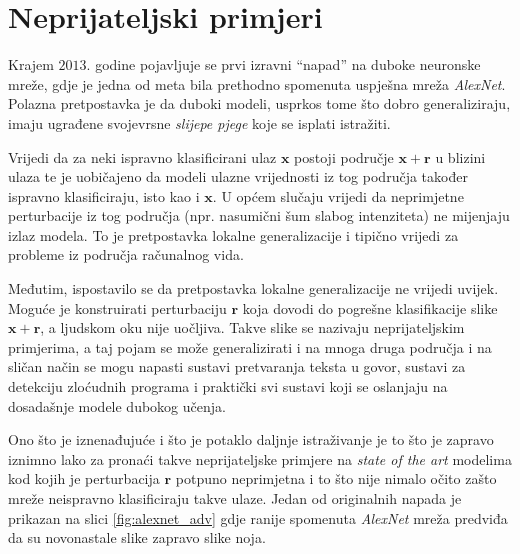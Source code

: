 \documentclass[utf8, diplomski]{fer}
\begin{document}
\section{Neprijateljski primjeri}
Krajem $2013.$ godine pojavljuje se prvi izravni ``napad'' na duboke neuronske mreže\citep{Szegedy2014IntriguingPO}, gdje je jedna od meta bila prethodno spomenuta uspješna mreža \textit{AlexNet}. Polazna pretpostavka je da duboki modeli, usprkos tome što dobro generaliziraju, imaju ugrađene svojevrsne \textit{slijepe pjege} koje se isplati istražiti.
\par
Vrijedi da za neki ispravno klasificirani ulaz $\boldsymbol{x}$ postoji područje $\boldsymbol{x} + \boldsymbol{r}$ u blizini ulaza te je uobičajeno da modeli ulazne vrijednosti iz tog područja također ispravno klasificiraju, isto kao i $\boldsymbol{x}$. U općem slučaju vrijedi da neprimjetne perturbacije iz tog područja (npr. nasumični šum slabog intenziteta) ne mijenjaju izlaz modela. To je pretpostavka lokalne generalizacije i tipično vrijedi za probleme iz područja računalnog vida.
\par
Međutim, ispostavilo se da pretpostavka lokalne generalizacije ne vrijedi uvijek. Moguće je konstruirati perturbaciju $\boldsymbol{r}$ koja dovodi do pogrešne klasifikacije slike $\boldsymbol{x} + \boldsymbol{r}$, a ljudskom oku nije uočljiva. Takve slike se nazivaju neprijateljskim primjerima, a taj pojam se može generalizirati i na mnoga druga područja i na sličan način se mogu napasti sustavi pretvaranja teksta u govor, sustavi za detekciju zloćudnih programa i praktički svi sustavi koji se oslanjaju na dosadašnje modele dubokog učenja. 
\par
Ono što je iznenađujuće i što je potaklo daljnje istraživanje je to što je zapravo iznimno lako za pronaći takve neprijateljske primjere na \textit{state of the art} modelima kod kojih je perturbacija $\boldsymbol{r}$ potpuno neprimjetna i to što nije nimalo očito zašto mreže neispravno klasificiraju takve ulaze. Jedan od originalnih napada je prikazan na slici \ref{fig:alexnet_adv} gdje ranije spomenuta \textit{AlexNet} mreža predviđa da su novonastale slike zapravo slike noja.
\end{document}
